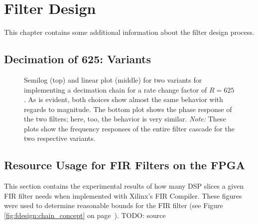 \chapter{Filter Design} %
\label{ch:app:fdesign}

This  chapter contains  some additional  information about  the filter  design
process.

\section{Decimation of 625: Variants} %
\label{sec:dec625_variants}

\begin{figure}
    \centering
    
    \caption[Decimation Chain Variants for Rate of 625]{%
        Semilog  (top)  and   linear  plot  (middle)  for   two  variants  for
        implementing  a  decimation   chain  for  a  rate   change  factor  of
        $R=625$. As is  evident, both  choices show  almost the  same behavior
        with regards to magnitude. The bottom plot shows the phase response of
        the two filters; here, too, the behavior is very similar. \emph{Note:}
        These plots show the frequency  responses of the entire filter cascade
        for the two respective variants.%
    }
    \label{fig:dec625_variants}
\end{figure}


\section{Resource Usage for FIR Filters on the FPGA} %
\label{sec:fir_filter_resouce_usage}

This   section   contains  the   experimental   results   of  how   many   DSP
slices  a  given   FIR  filter  needs  when  implemented   with  Xilinx's  FIR
Compiler. These  figures were  used  to determine  reasonable  bounds for  the
FIR  filter    (see  Figure~  \ref{fig:fdesign:chain_concept}  on
page~\pageref{fig:fdesign:chain_concept}).
TODO: source


